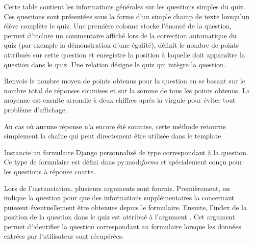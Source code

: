 \documentclass[a4,10pt,french]{sphinxmanual}
\begin{document}
\begin{fulllineitems}
\label{database:quiz.models.SimpleQuestion}
Cette table contient les informations générales sur les questions simples du quiz.
Ces questions sont présentées sous la forme d'un simple champ de texte lorsqu'un
élève complète le quiz. Une première colonne  stocke l'énoncé de la
question,  permet d'inclure un commentaire affiché lors de la
correction automatique du quiz (par exemple la démonstration d'une égalité),
 définit le nombre de points attribués sur cette question et 
enregistre la position à laquelle doit apparaître la question dans le quiz. Une relation
désigne le quiz qui intègre la question.

\begin{fulllineitems}
\label{database:quiz.models.SimpleQuestion.average_result}
Renvoie le nombre moyen de points obtenus pour la question en se basant sur
le nombre total de réponses soumises et sur la somme de tous les points obtenus.
La moyenne est ensuite arrondie à deux chiffres après la virgule pour éviter
tout problème d'affichage.

Au cas où aucune réponse n'a encore été soumise, cette méthode retourne
simplement la chaîne \code{-{-}} qui peut directement être utilisée dans le template.

\end{fulllineitems}


\begin{fulllineitems}
\label{database:quiz.models.SimpleQuestion.create_form}
Instancie un formulaire Django personnalisé de type  correspondant
à la question. Ce type de formulaire est défini dans py:mod:\emph{forms} et spécialement
conçu pour les questions à réponse courte.

Lors de l'instanciation, plusieurs arguments sont fournis. Premièrement,
on indique la question  pour que des informations supplémentaires
la concernant puissent éventuellement être obtenues depuis le formulaire.
Ensuite, l'index de la position de la question dans le quiz est attribué à
l'argument . Cet argument permet d'identifier la question correspondant
au formulaire lorsque les données entrées par l'utilisateur sont récupérées.


\end{fulllineitems}
\end{fulllineitems}
\end{document}
